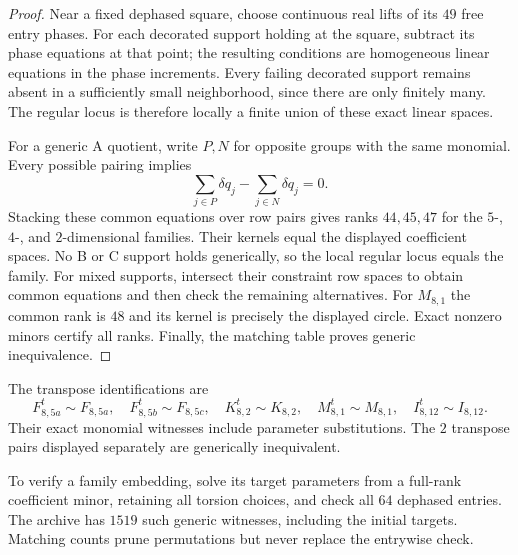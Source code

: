 \documentclass[11pt,a4paper]{article}
\theoremstyle{plain}
\theoremstyle{definition}
\numberwithin{equation}{section}
\begin{document}
\begin{proof}
Near a fixed dephased square, choose continuous real lifts of its $49$ free entry phases. For each decorated support holding at the square, subtract its phase equations at that point; the resulting conditions are homogeneous linear equations in the phase increments. Every failing decorated support remains absent in a sufficiently small neighborhood, since there are only finitely many. The regular locus is therefore locally a finite union of these exact linear spaces.

For a generic A quotient, write $P,N$ for opposite groups with the same monomial. Every possible pairing implies
$$\sum_{j\in P}\delta q_j-\sum_{j\in N}\delta q_j=0.$$
Stacking these common equations over row pairs gives ranks $44,45,47$ for the $5$-, $4$-, and $2$-dimensional families. Their kernels equal the displayed coefficient spaces. No B or C support holds generically, so the local regular locus equals the family. For mixed supports, intersect their constraint row spaces to obtain common equations and then check the remaining alternatives. For $M_{8,1}$ the common rank is $48$ and its kernel is precisely the displayed circle. Exact nonzero minors certify all ranks. Finally, the matching table proves generic inequivalence.
\end{proof}
The transpose identifications are
$$
 F_{8,5a}^{t}\sim F_{8,5a},\quad
 F_{8,5b}^{t}\sim F_{8,5c},\quad
 K_{8,2}^{t}\sim K_{8,2},\quad M_{8,1}^{t}\sim M_{8,1},
 \quad I_{8,12}^{t}\sim I_{8,12}.
$$
Their exact monomial witnesses include parameter substitutions. The $2$ transpose pairs displayed separately are generically inequivalent.

To verify a family embedding, solve its target parameters from a full-rank coefficient minor, retaining all torsion choices, and check all $64$ dephased entries. The archive has $1519$ such generic witnesses, including the initial targets. Matching counts prune permutations but never replace the entrywise check.
\end{document}
